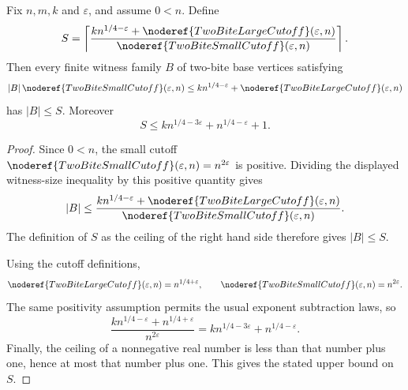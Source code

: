 \begin{helper}
Fix \(n,m,k\) and \(\varepsilon\), and assume \(0<n\).  Define
\[
S=\left\lceil
\frac{k n^{1/4-\varepsilon}+\noderef{TwoBiteLargeCutoff}(\varepsilon,n)}
     {\noderef{TwoBiteSmallCutoff}(\varepsilon,n)}
\right\rceil .
\]
Then every finite witness family \(B\) of two-bite base vertices satisfying
\[
|B|\,\noderef{TwoBiteSmallCutoff}(\varepsilon,n)
\le
k n^{1/4-\varepsilon}+\noderef{TwoBiteLargeCutoff}(\varepsilon,n)
\]
has \(|B|\le S\).  Moreover
\[
S\le k n^{1/4-3\varepsilon}+n^{1/4-\varepsilon}+1 .
\]
\end{helper}
\begin{proof}
Since \(0<n\), the small cutoff
\(\noderef{TwoBiteSmallCutoff}(\varepsilon,n)=n^{2\varepsilon}\) is positive.
Dividing the displayed witness-size inequality by this positive quantity gives
\[
|B|\le
\frac{k n^{1/4-\varepsilon}+\noderef{TwoBiteLargeCutoff}(\varepsilon,n)}
     {\noderef{TwoBiteSmallCutoff}(\varepsilon,n)}.
\]
The definition of \(S\) as the ceiling of the right hand side therefore gives
\(|B|\le S\).

Using the cutoff definitions,
\[
\noderef{TwoBiteLargeCutoff}(\varepsilon,n)=n^{1/4+\varepsilon},
\qquad
\noderef{TwoBiteSmallCutoff}(\varepsilon,n)=n^{2\varepsilon}.
\]
The same positivity assumption permits the usual exponent subtraction laws, so
\[
\frac{k n^{1/4-\varepsilon}+n^{1/4+\varepsilon}}{n^{2\varepsilon}}
= k n^{1/4-3\varepsilon}+n^{1/4-\varepsilon}.
\]
Finally, the ceiling of a nonnegative real number is less than that number plus
one, hence at most that number plus one.  This gives the stated upper bound on
\(S\).
\end{proof}
